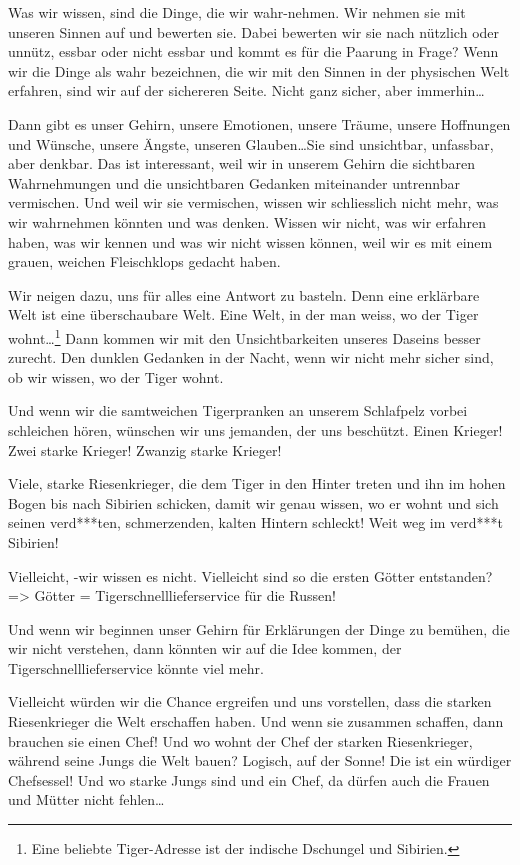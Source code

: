 \documentclass[11pt,titlepage,a5paper]{book}
\begin{document}
Was wir wissen, sind die Dinge, die wir wahr-nehmen. Wir nehmen sie mit unseren Sinnen auf und bewerten sie. Dabei bewerten wir sie nach nützlich oder unnütz, essbar oder nicht essbar und kommt es für die Paarung in Frage? Wenn wir die Dinge als wahr bezeichnen, die wir mit den Sinnen in der physischen Welt erfahren, sind wir auf der sichereren Seite. Nicht ganz sicher, aber immerhin\dots

Dann gibt es unser Gehirn, unsere Emotionen, unsere Träume, unsere Hoffnungen und Wünsche, unsere Ängste, unseren Glauben\dots Sie sind unsichtbar, unfassbar, aber denkbar. Das ist interessant, weil wir in unserem Gehirn die sichtbaren Wahrnehmungen und die unsichtbaren Gedanken miteinander untrennbar vermischen. Und weil wir sie vermischen, wissen wir schliesslich nicht mehr, was wir wahrnehmen könnten und was denken. Wissen wir nicht, was wir erfahren haben, was wir kennen und was wir nicht wissen können, weil wir es mit einem grauen, weichen Fleischklops gedacht haben.

Wir neigen dazu, uns für alles eine Antwort zu basteln. Denn eine erklärbare Welt ist eine überschaubare Welt. Eine Welt, in der man weiss, wo der Tiger wohnt\dots \footnote{Eine beliebte Tiger-Adresse ist der indische Dschungel und Sibirien.} Dann kommen wir mit den Unsichtbarkeiten unseres Daseins besser zurecht. Den dunklen Gedanken in der Nacht, wenn wir nicht mehr sicher sind, ob wir wissen, wo der Tiger wohnt.

Und wenn wir die samtweichen Tigerpranken an unserem Schlafpelz vorbei schleichen hören, wünschen wir uns jemanden, der uns beschützt. Einen Krieger! Zwei starke Krieger! Zwanzig starke Krieger!

 Viele, starke Riesenkrieger, die dem Tiger in den Hinter treten und ihn im hohen Bogen bis nach Sibirien schicken, damit wir genau wissen, wo er wohnt und sich seinen  verd***ten, schmerzenden, kalten Hintern schleckt! Weit weg im verd***t Sibirien!
 
Vielleicht, -wir wissen es nicht. Vielleicht sind so die ersten Götter entstanden? => Götter = Tigerschnelllieferservice für die Russen! 

Und wenn wir beginnen unser Gehirn für Erklärungen der Dinge zu bemühen, die wir nicht verstehen, dann könnten wir auf die Idee kommen, der Tigerschnelllieferservice könnte viel mehr.

Vielleicht würden wir die Chance ergreifen und uns vorstellen, dass die starken Riesenkrieger die Welt erschaffen haben. Und wenn sie zusammen schaffen, dann brauchen sie einen Chef! Und wo wohnt der Chef der starken Riesenkrieger, während seine Jungs die Welt bauen? Logisch, auf der Sonne! Die ist ein würdiger Chefsessel! Und wo starke Jungs sind und ein Chef, da dürfen auch die Frauen und Mütter nicht fehlen\dots 
\end{document}

